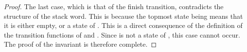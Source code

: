 \begin{isabellebody}
\begin{isamarkuptext}
\begin{lemma}
\begin{proof}
The last case, which is that of the finish transition, contradicts the structure of the stack word.
This is because the topmost state being  means that it is either empty,
or a state of . This is a direct consequence of the definition of the transition
functions of  and . Since  is not a state of
, this case cannot occur. The proof of the invariant is therefore complete.
\end{proof}
\end{lemma}


\end{isamarkuptext}
\end{isabellebody}
